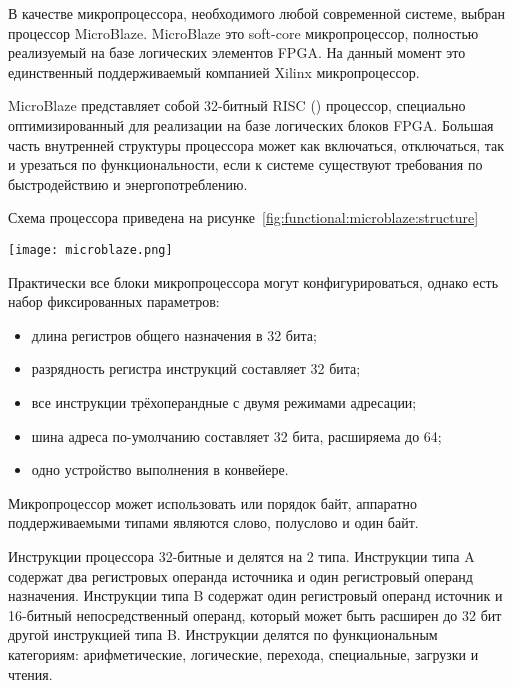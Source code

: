 В качестве микропроцессора, необходимого любой современной системе, выбран процессор MicroBlaze.
MicroBlaze это soft-core микропроцессор, полностью реализуемый на базе логических элементов FPGA.
На данный момент это единственный поддерживаемый компанией Xilinx микропроцессор.

MicroBlaze представляет собой 32-битный RISC () процессор,
специально оптимизированный для реализации на базе логических блоков FPGA. Большая
часть внутренней структуры процессора может как включаться, отключаться, так и урезаться
по функциональности, если к системе существуют требования по быстродействию и энергопотреблению.

Схема процессора приведена на рисунке~\ref{fig:functional:microblaze:structure}

\begin{center}
  \centering
  \texttt{[image: microblaze.png]}
  \label{fig:functional:microblaze:structure}
\end{center}

Практически все блоки микропроцессора могут конфигурироваться, однако есть набор фиксированных
параметров:
\begin{itemize}
  \item длина регистров общего назначения в 32 бита;
  \item разрядность регистра инструкций составляет 32 бита;
  \item все инструкции трёхоперандные с двумя режимами адресации;
  \item шина адреса по-умолчанию составляет 32 бита, расширяема до 64;
  \item одно устройство выполнения в конвейере.
\end{itemize}

Микропроцессор может использовать  или  порядок байт,
аппаратно поддерживаемыми типами являются слово, полуслово и один байт.

Инструкции процессора 32-битные и делятся на 2 типа. Инструкции типа A содержат
два регистровых операнда источника и один регистровый операнд назначения. Инструкции
типа B содержат один регистровый операнд источник и 16-битный непосредственный операнд,
который может быть расширен до 32 бит другой инструкцией типа B. Инструкции делятся по
функциональным категориям: арифметические, логические, перехода, специальные, загрузки и чтения.

